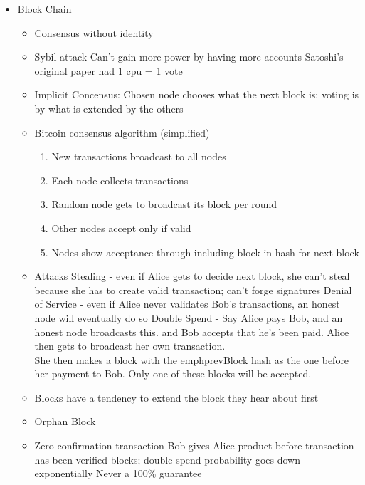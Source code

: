 \documentclass{article}
\begin{document}
\begin{itemize}
  \item Block Chain
    \begin{itemize}
      \item Consensus without identity
      \item Sybil attack
        \subitem Can't gain more power by having more accounts
        \subitem Satoshi's original paper had 1 cpu = 1 vote
      \item Implicit Concensus:
        \subitem Chosen node chooses what the next block is; voting is by what is extended by the others
      \item Bitcoin consensus algorithm (simplified)
        \begin{enumerate}
          \item New transactions broadcast to all nodes
          \item Each node collects transactions
          \item Random node gets to broadcast its block per round
          \item Other nodes accept only if valid
          \item Nodes show acceptance through including block in hash for next block
        \end{enumerate}
      \item Attacks
        \subitem Stealing - even if Alice gets to decide next block, she can't steal because she has to create valid transaction; can't forge signatures
        \subitem Denial of Service - even if Alice never validates Bob's transactions, an honest node will eventually do so
        \subitem Double Spend - Say Alice pays Bob, and an honest node broadcasts this. and Bob accepts that he's been paid. Alice then gets to broadcast her own transaction.\\
        She then makes a block with the emph{prevBlock} hash as the one before her payment to Bob. Only one of these blocks will be accepted.
      \item Blocks have a tendency to extend the block they hear about first
      \item Orphan Block
      \item Zero-confirmation transaction
        \subitem Bob gives Alice product before transaction has been verified
         blocks; double spend probability goes down exponentially
        \subitem Never a 100\% guarantee
    \end{itemize}


\end{itemize}
\end{document}
